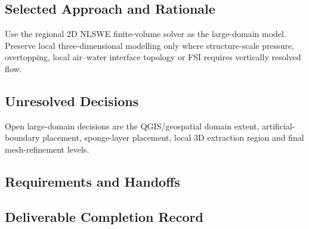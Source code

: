 
\subsection{Selected Approach and Rationale}
\label{sec:res-mod-lrg-selected-approach}


Use the regional 2D NLSWE finite-volume solver as the large-domain
model. Preserve local three-dimensional modelling only where
structure-scale pressure, overtopping, local air--water interface
topology or FSI requires vertically resolved flow.

\subsection{Unresolved Decisions}
\label{sec:res-mod-lrg-unresolved-decisions}


Open large-domain decisions are the QGIS/geospatial domain extent,
artificial-boundary placement, sponge-layer placement, local 3D
extraction region and final mesh-refinement levels.

\subsection{Requirements and Handoffs}
\label{sec:res-mod-lrg-requirements}


\subsection{Deliverable Completion Record}
\label{sec:res-mod-lrg-completion-record}

%
%
%
